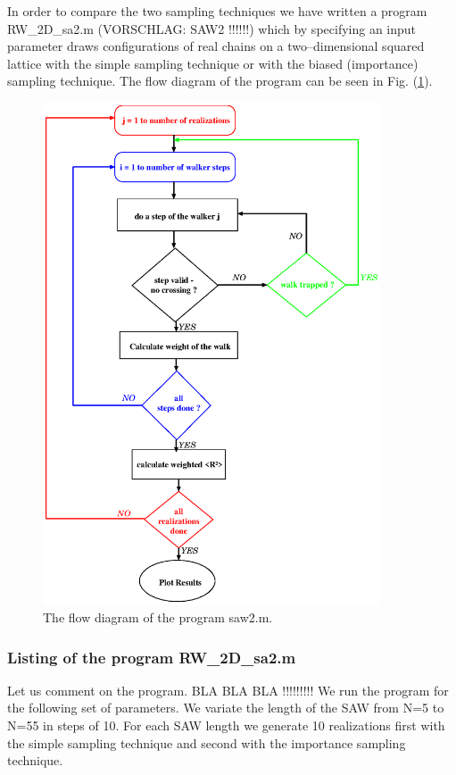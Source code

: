 In order to compare the two sampling techniques we have written a 
program {\sf RW\_2D\_sa2.m} (VORSCHLAG: SAW2 !!!!!!) 
which by specifying an input parameter
draws configurations of real chains on a two--dimensional squared lattice 
with the simple sampling 
technique or with the biased (importance) sampling technique.
The flow diagram of the program can be seen in Fig. 
(\ref{F_RW2D_ALGORITHM}).
\begin{figure}
\label{F_RW2D_ALGORITHM}
\includegraphics[width=10cm]{./Figures/f_rw2d_algorithm.eps}
\caption{The flow diagram of the program saw2.m.}
\end{figure}


\subsubsection{Listing of the program {\sf RW\_2D\_sa2.m}}

Let us comment on the program. BLA BLA BLA !!!!!!!!!
We run the program for the following set of parameters. We variate
the length of the SAW from N=5 to N=55 in steps of 10. For each
SAW length we generate 10 realizations first with the simple
sampling technique and second with the importance sampling 
technique. 

